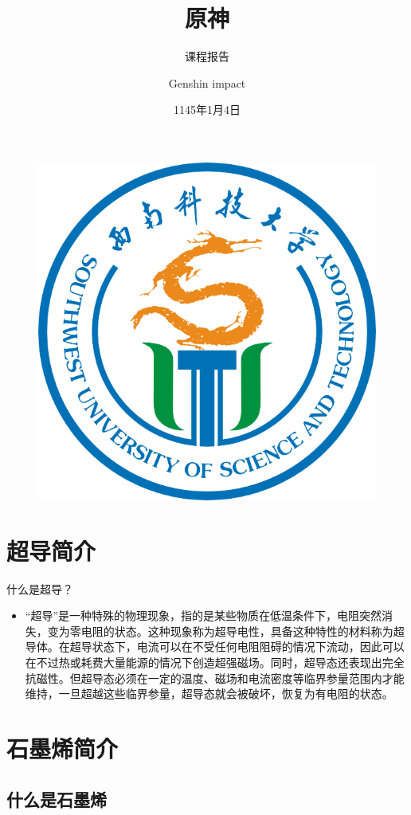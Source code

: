\documentclass{beamer}
\author{Genshin impact}
\title{原神}
\subtitle{课程报告}
\institute{提瓦特的大陆}
\date{1145年1月4日}
\begin{document}
\kaishu
\begin{frame}
    \titlepage
    \begin{figure}[htpb]
        \begin{center}
            \includegraphics[width=0.2\linewidth]{pic/swust.png}
        \end{center}
    \end{figure}
\end{frame}

\begin{frame}
    \tableofcontents[sectionstyle=show,subsectionstyle=show/shaded/hide,subsubsectionstyle=show/shaded/hide]
\end{frame}


\section{超导简介}

\begin{frame}{什么是超导？}
    \begin{itemize}[<+-| alert@+>] %
        \item “超导”是一种特殊的物理现象，指的是某些物质在低温条件下，电阻突然消失，变为零电阻的状态。这种现象称为超导电性，具备这种特性的材料称为超导体。在超导状态下，电流可以在不受任何电阻阻碍的情况下流动，因此可以在不过热或耗费大量能源的情况下创造超强磁场。同时，超导态还表现出完全抗磁性。但超导态必须在一定的温度、磁场和电流密度等临界参量范围内才能维持，一旦超越这些临界参量，超导态就会被破坏，恢复为有电阻的状态。
    \end{itemize}
\end{frame}


\section{石墨烯简介}

\subsection{什么是石墨烯}
\end{document}
